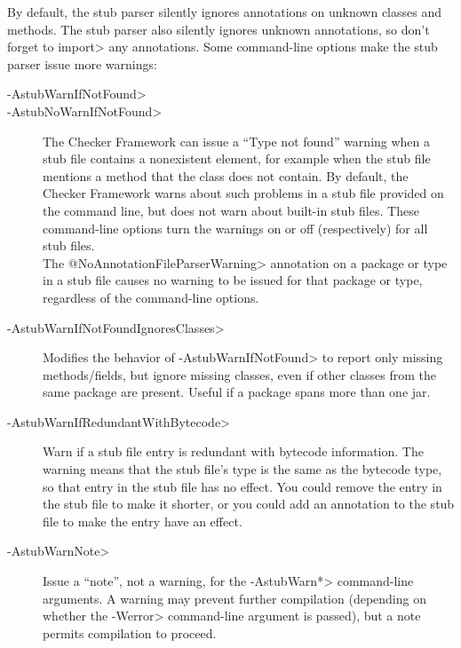By default, the stub parser silently ignores
annotations on unknown classes and methods.
The stub parser also silently ignores unknown annotations, so don't forget to
\<import> any annotations.
Some command-line options make the stub parser issue more warnings:

\begin{description}
\item[\<-AstubWarnIfNotFound>]
\item[\<-AstubNoWarnIfNotFound>]
  The Checker Framework can issue a ``Type not found'' warning
  when a stub file contains a nonexistent
  element, for example when the stub file mentions a method that the class
  does not contain.
  By default, the Checker Framework warns about such problems in a stub
  file provided on the command line, but does not warn about built-in stub files.
  These command-line options turn the warnings on or off (respectively) for
  all stub files. \\
  The \<@NoAnnotationFileParserWarning> annotation on a package or type in a stub file
  causes no warning to be issued for that package or type, regardless of
  the command-line options.


\item[\<-AstubWarnIfNotFoundIgnoresClasses>]
  Modifies the behavior of \<-AstubWarnIfNotFound>
  to report only missing methods/fields, but ignore missing classes, even if
  other classes from the same package are present.
  Useful if a package spans more than one jar.

\item[\<-AstubWarnIfRedundantWithBytecode>]
  Warn if a stub file entry is redundant with bytecode information.  The
  warning means that the stub file's type is the same as the bytecode type,
  so that entry in the stub file has no effect.  You could remove the
  entry in the stub file to make it shorter, or you could add an annotation
  to the stub file to make the entry have an effect.


\item[\<-AstubWarnNote>]
  Issue a ``note'', not a warning, for the \<-AstubWarn*> command-line
  arguments.  A warning may prevent further compilation (depending on
  whether the \<-Werror> command-line argument is passed), but a note permits
  compilation to proceed.

\end{description}

